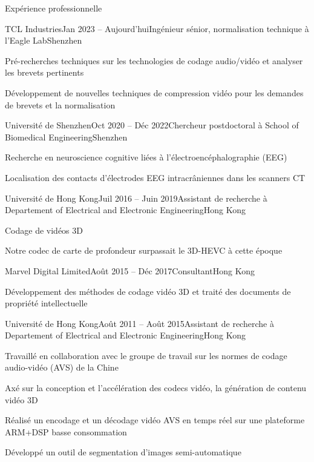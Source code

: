 \documentclass{resume} %
\begin{document}
\begin{rSection}{Expérience professionnelle}
	\begin{rSubsection}{TCL Industries}{Jan 2023 -- Aujourd'hui}{Ingénieur sénior, normalisation technique à l'Eagle Lab}{Shenzhen}
		\item Pré-recherches techniques sur les technologies de codage audio/vidéo et analyser les brevets pertinents
		\item Développement de nouvelles techniques de compression vidéo pour les demandes de brevets et la normalisation
	\end{rSubsection}
	
	\begin{rSubsection}{Université de Shenzhen}{Oct 2020 -- Déc 2022}{Chercheur postdoctoral à School of Biomedical Engineering}{Shenzhen}
		\item Recherche en neuroscience cognitive liées à l'électroencéphalographie (EEG)
		\item Localisation des contacts d'électrodes EEG intracrâniennes dans les scanners CT
	\end{rSubsection}
	
	\begin{rSubsection}{Université de Hong Kong}{Juil 2016 -- Juin 2019}{Assistant de recherche à Departement of Electrical and Electronic Engineering}{Hong Kong}
		\item Codage de vidéos 3D
		\item Notre codec de carte de profondeur surpassait le 3D-HEVC à cette époque
	\end{rSubsection}
	
	\begin{rSubsection}{Marvel Digital Limited}{Août 2015 -- Déc 2017}{Consultant}{Hong Kong}
		\item Développement des méthodes de codage vidéo 3D et traité des documents de propriété intellectuelle 
	\end{rSubsection}
	
	\begin{rSubsection}{Université de Hong Kong}{Août 2011 -- Août 2015}{Assistant de recherche à Departement of Electrical and Electronic Engineering}{Hong Kong}
		\item Travaillé en collaboration avec le groupe de travail sur les normes de codage audio-vidéo (AVS) de la Chine
		\item Axé sur la conception et l'accélération des codecs vidéo, la génération de contenu vidéo 3D
		\item Réalisé un encodage et un décodage vidéo AVS en temps réel sur une plateforme ARM+DSP basse consommation
		\item Développé un outil de segmentation d'images semi-automatique
	\end{rSubsection}
	

\end{rSection}
\end{document}
